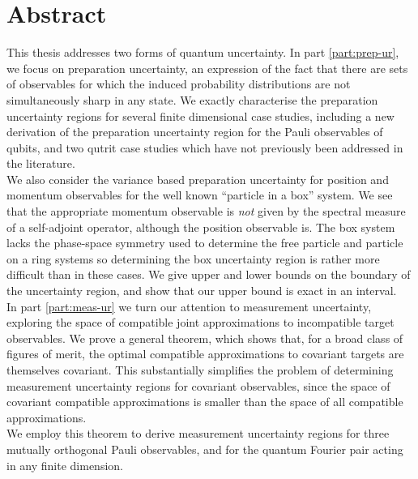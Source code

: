 



\chapter*{Abstract}
This thesis addresses two forms of quantum uncertainty. In part \ref{part:prep-ur}, we focus on preparation uncertainty, an expression of the fact that there are sets of observables for which the induced probability distributions are not simultaneously sharp in any state. We exactly characterise the preparation uncertainty regions for several finite dimensional case studies, including a new derivation of the preparation uncertainty region for the Pauli observables of qubits, and two qutrit case studies which have not previously been addressed in the literature.\\
We also consider the variance based preparation uncertainty for position and momentum observables for the well known ``particle in  a box'' system. We see that the appropriate momentum observable is \emph{not} given by the spectral measure of a self-adjoint operator, although the position observable is. The box system lacks the phase-space symmetry used to determine the free particle and particle on a ring systems so determining the box uncertainty region is rather more difficult than in these cases. We give upper and lower bounds on the boundary of the uncertainty region, and show that our upper bound is exact in an interval.\\
In part \ref{part:meas-ur} we turn our attention to measurement uncertainty, exploring the space of compatible joint approximations to incompatible target observables. We prove a general theorem, which shows that, for a broad class of figures of merit, the optimal compatible approximations to covariant targets are themselves covariant. This substantially simplifies the problem of determining measurement uncertainty regions for covariant observables, since the space of covariant compatible approximations is smaller than the space of all compatible approximations.\\
We employ this theorem to derive measurement uncertainty regions for three mutually orthogonal Pauli observables, and for the quantum Fourier pair acting in any finite dimension.
\clearpage